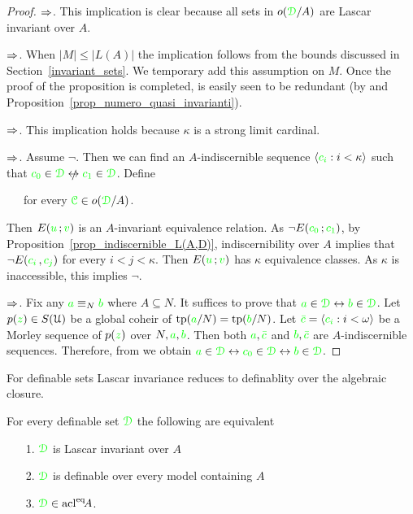 \begin{proof}
  $\Rightarrow$. This implication is clear because all sets in $o({\color{green}\EuScript D}/A)$ are Lascar invariant over $A$. 
  
  $\Rightarrow$. When $|M|\le|L(A)|$ the implication follows from the bounds discussed in Section~\ref{invariant_sets}.
We temporary add this assumption on $M$.
Once the proof of the proposition is completed, is easily seen to be redundant (by  and Proposition~\ref{prop_numero_quasi_invarianti}). 
  
  $\Rightarrow$. This implication holds because $\kappa$ is a strong limit cardinal.

  $\Rightarrow$. Assume $\neg$.
Then we can find an $A\mbox{-}$indiscernible sequence $\langle{\color{green}c_i}:i<\kappa\rangle$ such that ${\gr c_0}\in\grD\niff {\gr c_1}\in\grD$.
Define

  \ \ \ for every ${\color{green}\EuScript C}\in o({\color{green}\EuScript D}/A)$.

  Then $E({\color{green} u}\,;{\color{green} v})$ is an $A\mbox{-}$invariant equivalence relation.
As $\neg E({\color{green} c_0}\,;{\color{green} c_1})$, by Proposition~\ref{prop_indiscernible_L(A,D)}, indiscernibility over $A$ implies that $\neg E({\color{green} c_i\,},{\color{green} c_j})$ for every $i<j<\kappa$.
Then $E({\color{green} u}\,;{\color{green} v})$ has $\kappa$ equivalence classes.
As $\kappa$ is inaccessible, this implies $\neg$.

  $\Rightarrow$. Fix any ${\color{green} a}\equiv_N{\color{green} b}$ where $A\subseteq N$.
It suffices to prove that ${\color{green} a}\in{\color{green}\EuScript D}\leftrightarrow{\color{green}b}\in{\color{green}\EuScript D}$.
Let $p({\color{green} z})\in S(\EuScript U)$ be a global coheir of ${\rm tp}({\color{green} a}/N)={\rm tp}({\color{green} b}/N)$.
Let ${\color{green}\bar c}=\langle{\color{green}c_i}:i<\omega\rangle$ be a Morley sequence of $p({\color{green} z})$ over $N,{\color{green} a},{\color{green} b}$.
Then both ${\color{green} a},{\color{green}\bar c}$ and ${\color{green} b},{\color{green}\bar c}$ are $A\mbox{-}$indiscernible sequences.
Therefore, from  we obtain ${\color{green} a}\in{\color{green}\EuScript D}\leftrightarrow{\color{green}c_0}\in{\color{green}\EuScript D}\leftrightarrow{\color{green}b}\in{\color{green}\EuScript D}$. 
\end{proof}

For definable sets Lascar invariance reduces to definablity over the algebraic closure.

\begin{corollary}\label{coroll_defble_Lascar_inv}
For every definable set ${\color{green}\EuScript D}$ the following are equivalent
  \begin{itemize}
    \item[1.] ${\color{green}\EuScript D}$ is Lascar invariant over $A$
    \item[2.] ${\color{green}\EuScript D}$ is definable over every model containing $A$
    \item[3.] ${\color{green}\EuScript D}\in{\rm acl}^{{\rm eq}}\!A$.
  \end{itemize}\smallskip
\end{corollary}

